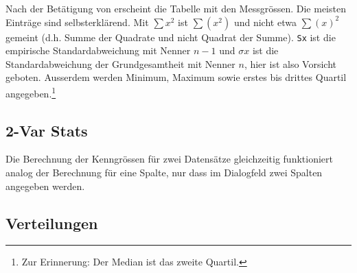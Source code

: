 \documentclass[a4paper,11pt,notitlepage,halfparskip,headsepline,normalheadings,twoside]{scrartcl}
\newlength{\tikey}
\newcommand{\keystroke}[1]{\settowidth{\tikey}{\scriptsize #1}\psframebox[framearc=0.2]{\parbox{\tikey}{\scriptsize\textsf{#1}}}}
\begin{document}
\begin{window}
Nach der Betätigung von \keystroke{ENTER} erscheint die Tabelle mit den
Messgrössen. Die meisten Einträge sind selbsterklärend. Mit $\sum x^2$ ist
$\sum\left(x^2\right)$ und nicht etwa $\sum(x)^2$ gemeint (d.h. Summe der
Quadrate und nicht Quadrat der Summe). \texttt{Sx} ist die empirische
Standardabweichung mit Nenner $n-1$ und $\sigma x$ ist die Standardabweichung
der Grundgesamtheit mit Nenner $n$, hier ist also Vorsicht geboten. Ausserdem
werden Minimum, Maximum sowie erstes bis drittes Quartil angegeben.\footnote{Zur
Erinnerung: Der Median ist das zweite Quartil.}
\end{window}

\subsection{2-Var Stats}
Die Berechnung der Kenngrössen für zwei Datensätze gleichzeitig funktioniert analog
der Berechnung für eine Spalte, nur dass im Dialogfeld zwei Spalten angegeben
werden.


\subsection{Verteilungen}
\end{document}
